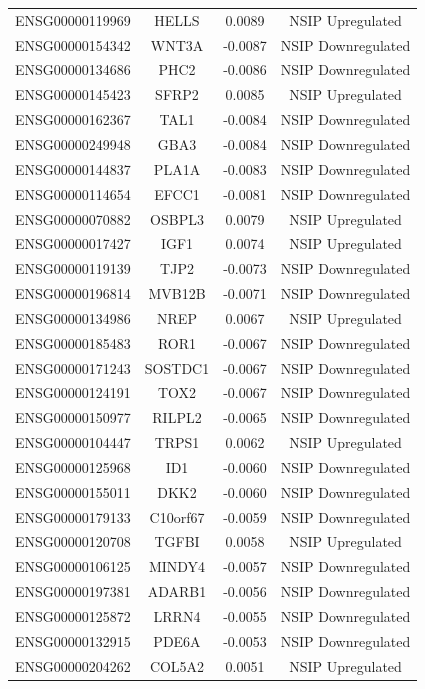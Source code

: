 \documentclass[
]{article}
\begin{document}
\begin{singlespace}
\begin{longtable}[t]{lccc}
ENSG00000119969 & HELLS & 0.0089 & NSIP Upregulated\\
ENSG00000154342 & WNT3A & -0.0087 & NSIP Downregulated\\
\addlinespace
ENSG00000134686 & PHC2 & -0.0086 & NSIP Downregulated\\
ENSG00000145423 & SFRP2 & 0.0085 & NSIP Upregulated\\
ENSG00000162367 & TAL1 & -0.0084 & NSIP Downregulated\\
ENSG00000249948 & GBA3 & -0.0084 & NSIP Downregulated\\
ENSG00000144837 & PLA1A & -0.0083 & NSIP Downregulated\\
\addlinespace
ENSG00000114654 & EFCC1 & -0.0081 & NSIP Downregulated\\
ENSG00000070882 & OSBPL3 & 0.0079 & NSIP Upregulated\\
ENSG00000017427 & IGF1 & 0.0074 & NSIP Upregulated\\
ENSG00000119139 & TJP2 & -0.0073 & NSIP Downregulated\\
ENSG00000196814 & MVB12B & -0.0071 & NSIP Downregulated\\
\addlinespace
ENSG00000134986 & NREP & 0.0067 & NSIP Upregulated\\
ENSG00000185483 & ROR1 & -0.0067 & NSIP Downregulated\\
ENSG00000171243 & SOSTDC1 & -0.0067 & NSIP Downregulated\\
ENSG00000124191 & TOX2 & -0.0067 & NSIP Downregulated\\
ENSG00000150977 & RILPL2 & -0.0065 & NSIP Downregulated\\
\addlinespace
ENSG00000104447 & TRPS1 & 0.0062 & NSIP Upregulated\\
ENSG00000125968 & ID1 & -0.0060 & NSIP Downregulated\\
ENSG00000155011 & DKK2 & -0.0060 & NSIP Downregulated\\
ENSG00000179133 & C10orf67 & -0.0059 & NSIP Downregulated\\
ENSG00000120708 & TGFBI & 0.0058 & NSIP Upregulated\\
\addlinespace
ENSG00000106125 & MINDY4 & -0.0057 & NSIP Downregulated\\
ENSG00000197381 & ADARB1 & -0.0056 & NSIP Downregulated\\
ENSG00000125872 & LRRN4 & -0.0055 & NSIP Downregulated\\
ENSG00000132915 & PDE6A & -0.0053 & NSIP Downregulated\\
ENSG00000204262 & COL5A2 & 0.0051 & NSIP Upregulated\\

\end{longtable}
\end{singlespace}
\end{document}
